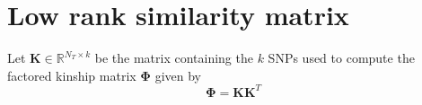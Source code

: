 \documentclass[12pt,letter]{article}\usepackage[]{graphicx}\usepackage[]{color}
\newcommand{\bX}{\textbf{X}}
\newcommand{\bXtilde}{\widetilde{\bX}}
\newcommand{\bU}{\textbf{U}}
\newcommand{\mb}[1]{\mathbf{#1}}
\newcommand{\bbeta}{\boldsymbol{\beta}}
\newcommand{\bPhi}{\boldsymbol{\Phi}}
\begin{document}

\section{Low rank similarity matrix}

Let $\mb{K} \in \mathbb{R}^{N_T\times k}$ be the matrix containing the $k$ SNPs used to compute the factored kinship matrix $\bPhi$ given by
\begin{equation}
	\bPhi = \mb{K}\mb{K}^T \label{eq:factored}
\end{equation}
\end{document}
